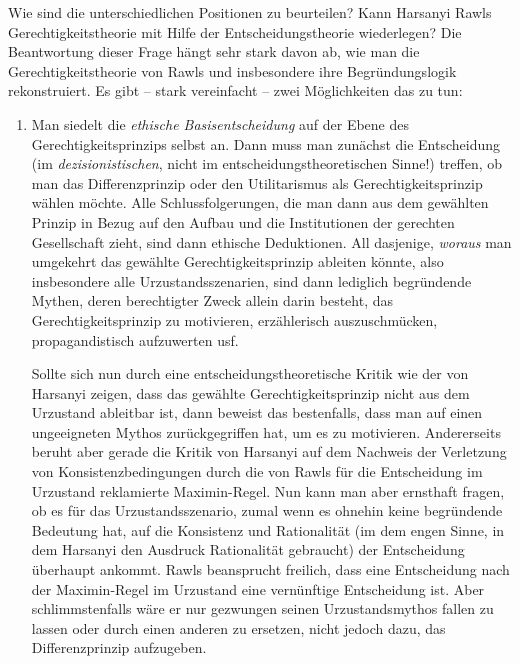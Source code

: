 Wie sind die unterschiedlichen Positionen zu beurteilen? Kann Harsanyi Rawls
Gerechtigkeitstheorie mit Hilfe der Entscheidungstheorie wiederlegen? Die
Beantwortung dieser Frage hängt sehr stark davon ab, wie man die
Gerechtigkeitstheorie von Rawls und insbesondere ihre Begründungslogik
rekonstruiert. Es gibt – stark vereinfacht – zwei Möglichkeiten das zu tun:

\begin{enumerate}
\item {} 
  Man siedelt die {\em ethische Basisentscheidung} auf der Ebene
  des Gerechtigkeitsprinzips selbst an. Dann muss man zunächst die
  Entscheidung (im {\em dezisionistischen}, nicht im
  entscheidungstheoretischen Sinne!) treffen, ob man das
  Differenzprinzip oder den Utilitarismus als Gerechtigkeitsprinzip
  wählen möchte. Alle Schlussfolgerungen, die man dann aus dem
  gewählten Prinzip in Bezug auf den Aufbau und die Institutionen der
  gerechten Gesellschaft zieht, sind dann ethische Deduktionen. All
  dasjenige, {\em woraus} man umgekehrt das gewählte Gerechtigkeitsprinzip
  ableiten könnte, also insbesondere alle Urzustandsszenarien, sind dann
  lediglich begründende Mythen, deren berechtigter Zweck allein darin
  besteht, das Gerechtigkeitsprinzip zu motivieren, erzählerisch
  auszuschmücken, propagandistisch aufzuwerten usf.

  Sollte sich nun durch eine entscheidungstheoretische Kritik wie der von
  Harsanyi zeigen, dass das gewählte Gerechtigkeitsprinzip nicht aus dem
  Urzustand ableitbar ist, dann beweist das bestenfalls, dass man auf einen
  ungeeigneten Mythos zurückgegriffen hat, um es zu motivieren. Andererseits
  beruht aber gerade die Kritik von Harsanyi auf dem Nachweis der Verletzung von
  Konsistenzbedingungen durch die von Rawls für die Entscheidung im Urzustand
  reklamierte Maximin-Regel. Nun kann man aber ernsthaft fragen, ob es für das
  Urzustandsszenario, zumal wenn es ohnehin keine begründende Bedeutung hat, auf
  die Konsistenz und Rationalität (im dem engen Sinne, in dem Harsanyi den
  Ausdruck Rationalität gebraucht) der Entscheidung überhaupt ankommt. Rawls
  beansprucht freilich, dass eine Entscheidung nach der Maximin-Regel im
  Urzustand eine vernünftige Entscheidung ist. Aber schlimmstenfalls wäre er
  nur gezwungen seinen Urzustandsmythos fallen zu lassen oder durch einen
  anderen zu ersetzen, nicht jedoch dazu, das Differenzprinzip aufzugeben.


\end{enumerate}
